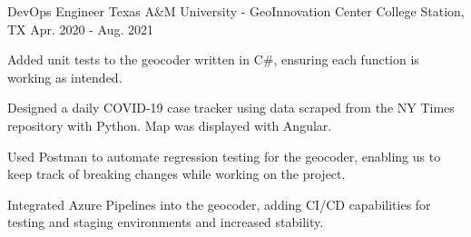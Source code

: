 \begin{cventries}
\cventry
  {DevOps Engineer} %
  {Texas A\&M University - GeoInnovation Center} %
  {College Station, TX} %
  {Apr. 2020 - Aug. 2021} %
  {
    \begin{cvitems} %
        \item {Added unit tests to the geocoder written in C\#, ensuring each function is working as intended.}
        \item {Designed a daily COVID-19 case tracker using data scraped from the NY Times repository with Python. Map was displayed with Angular.}
        \item {Used Postman to automate regression testing for the geocoder, enabling us to keep track of breaking changes while working on the project.}
        \item {Integrated Azure Pipelines into the geocoder, adding CI/CD capabilities for testing and staging environments and increased stability.}
    \end{cvitems}
  }


\end{cventries}
